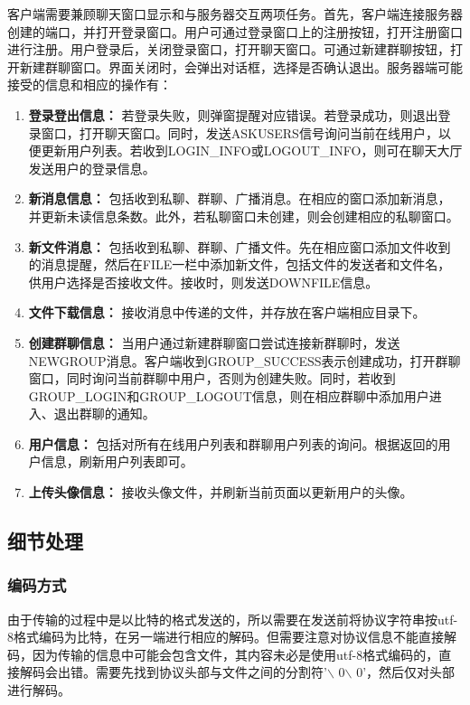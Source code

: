 \documentclass[12pt]{article} %
\begin{document}
\begin{sloppypar}
客户端需要兼顾聊天窗口显示和与服务器交互两项任务。首先，客户端连接服务器创建的端口，并打开登录窗口。用户可通过登录窗口上的注册按钮，打开注册窗口进行注册。用户登录后，关闭登录窗口，打开聊天窗口。可通过新建群聊按钮，打开新建群聊窗口。界面关闭时，会弹出对话框，选择是否确认退出。服务器端可能接受的信息和相应的操作有：
\begin{enumerate}
	\item {\bf 登录登出信息：} 若登录失败，则弹窗提醒对应错误。若登录成功，则退出登录窗口，打开聊天窗口。同时，发送ASKUSERS信号询问当前在线用户，以便更新用户列表。若收到LOGIN\_INFO或LOGOUT\_INFO，则可在聊天大厅发送用户的登录信息。
	\item {\bf 新消息信息：} 包括收到私聊、群聊、广播消息。在相应的窗口添加新消息，并更新未读信息条数。此外，若私聊窗口未创建，则会创建相应的私聊窗口。
	\item {\bf 新文件消息：} 包括收到私聊、群聊、广播文件。先在相应窗口添加文件收到的消息提醒，然后在FILE一栏中添加新文件，包括文件的发送者和文件名，供用户选择是否接收文件。接收时，则发送DOWNFILE信息。
	\item {\bf 文件下载信息：} 接收消息中传递的文件，并存放在客户端相应目录下。
	\item {\bf 创建群聊信息：} 当用户通过新建群聊窗口尝试连接新群聊时，发送NEWGROUP消息。客户端收到GROUP\_SUCCESS表示创建成功，打开群聊窗口，同时询问当前群聊中用户，否则为创建失败。同时，若收到GROUP\_LOGIN和GROUP\_LOGOUT信息，则在相应群聊中添加用户进入、退出群聊的通知。
	\item {\bf 用户信息：} 包括对所有在线用户列表和群聊用户列表的询问。根据返回的用户信息，刷新用户列表即可。
	\item {\bf 上传头像信息：} 接收头像文件，并刷新当前页面以更新用户的头像。
\end{enumerate}

\subsection{细节处理}

\subsubsection{编码方式}

由于传输的过程中是以比特的格式发送的，所以需要在发送前将协议字符串按utf-8格式编码为比特，在另一端进行相应的解码。但需要注意对协议信息不能直接解码，因为传输的信息中可能会包含文件，其内容未必是使用utf-8格式编码的，直接解码会出错。需要先找到协议头部与文件之间的分割符'$\backslash$ 0$\backslash$ 0'，然后仅对头部进行解码。


\end{sloppypar}
\end{document}
